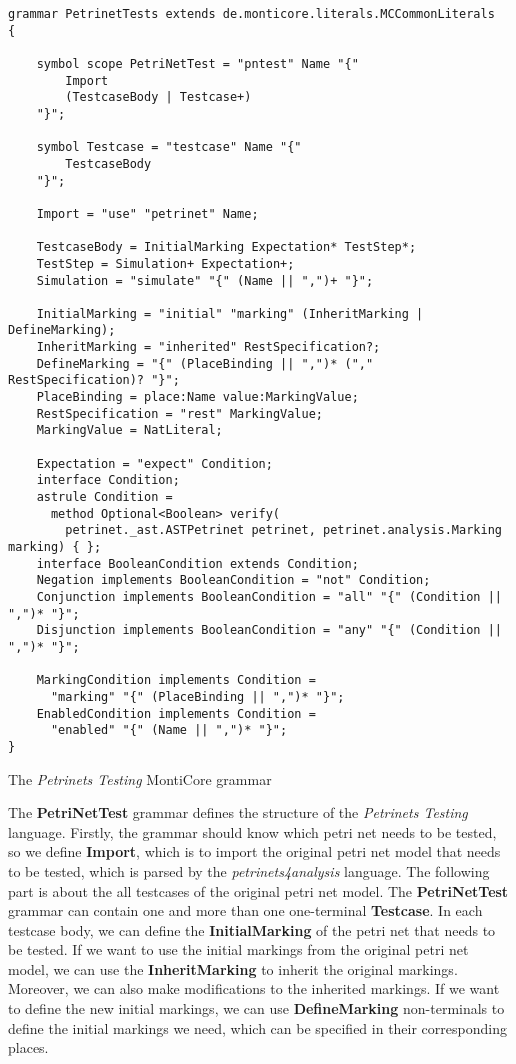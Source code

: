 \begin{lstfloat}
	\centering
\begin{lstlisting}[style=mcgrammar]
grammar PetrinetTests extends de.monticore.literals.MCCommonLiterals  {

    symbol scope PetriNetTest = "pntest" Name "{"
        Import
        (TestcaseBody | Testcase+)
    "}";

    symbol Testcase = "testcase" Name "{"
        TestcaseBody
    "}";

    Import = "use" "petrinet" Name;

    TestcaseBody = InitialMarking Expectation* TestStep*;
    TestStep = Simulation+ Expectation+;
    Simulation = "simulate" "{" (Name || ",")+ "}";

    InitialMarking = "initial" "marking" (InheritMarking | DefineMarking);
    InheritMarking = "inherited" RestSpecification?;
    DefineMarking = "{" (PlaceBinding || ",")* ("," RestSpecification)? "}";
    PlaceBinding = place:Name value:MarkingValue;
    RestSpecification = "rest" MarkingValue;
    MarkingValue = NatLiteral;

    Expectation = "expect" Condition;
    interface Condition;
    astrule Condition = 
      method Optional<Boolean> verify(
        petrinet._ast.ASTPetrinet petrinet, petrinet.analysis.Marking marking) { };
    interface BooleanCondition extends Condition;
    Negation implements BooleanCondition = "not" Condition;
    Conjunction implements BooleanCondition = "all" "{" (Condition || ",")* "}";
    Disjunction implements BooleanCondition = "any" "{" (Condition || ",")* "}";

    MarkingCondition implements Condition = 
      "marking" "{" (PlaceBinding || ",")* "}";
    EnabledCondition implements Condition = 
      "enabled" "{" (Name || ",")* "}";
}
\end{lstlisting}
	\caption{The \emph{Petrinets Testing} MontiCore grammar}\label{lst:language:grammar}
\end{lstfloat}


The \textbf{PetriNetTest} grammar defines the structure of the \emph{Petrinets Testing} language. Firstly, the grammar should know which petri net needs to be tested, so we define \textbf{Import}, which is to import the original petri net model that needs to be tested, which is parsed by the \emph{petrinets4analysis} language\cite{Hein}. The following part is about the all testcases of the original petri net model. The \textbf{PetriNetTest} grammar can contain one and more than one one-terminal \textbf{Testcase}. In each testcase body, we can define the \textbf{InitialMarking} of the petri net that needs to be tested. If we want to use the initial markings from the original petri net model, we can use the \textbf{InheritMarking} to inherit the original markings. Moreover, we can also make modifications to the inherited markings. If we want to define the new initial markings, we can use \textbf{DefineMarking} non-terminals to define the initial markings we need, which can be specified in their corresponding places.


